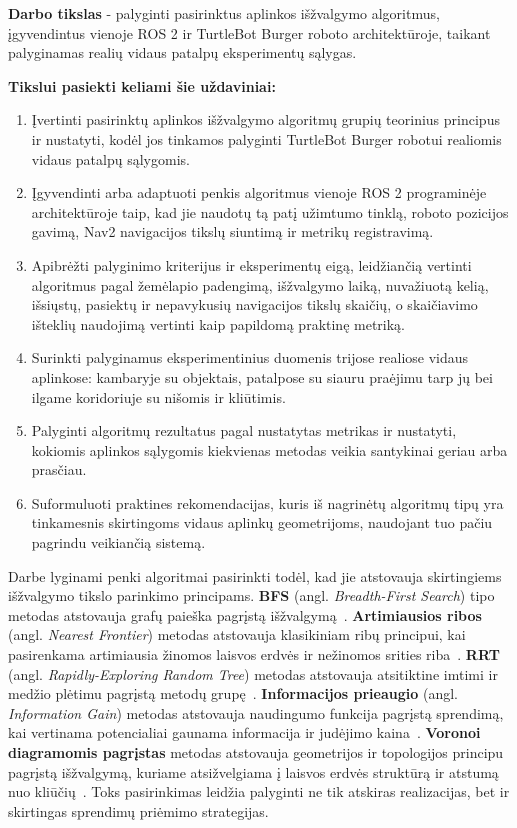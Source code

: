 \documentclass[]{VUMIFTemplateClass}
\begin{document}
\textbf{Darbo tikslas} - palyginti pasirinktus aplinkos išžvalgymo algoritmus, įgyvendintus vienoje ROS 2 ir TurtleBot Burger roboto architektūroje, taikant
palyginamas realių vidaus patalpų eksperimentų sąlygas.


\textbf{Tikslui pasiekti keliami šie uždaviniai:}
\begin{enumerate}
  \item Įvertinti pasirinktų aplinkos išžvalgymo algoritmų grupių teorinius principus ir nustatyti, kodėl jos tinkamos palyginti TurtleBot Burger robotui realiomis
 vidaus patalpų sąlygomis.
 \item Įgyvendinti arba adaptuoti penkis algoritmus vienoje ROS 2 programinėje architektūroje taip, kad jie naudotų tą patį užimtumo tinklą, roboto pozicijos
 gavimą, Nav2 navigacijos tikslų siuntimą ir metrikų registravimą.
 \item Apibrėžti palyginimo kriterijus ir eksperimentų eigą, leidžiančią vertinti algoritmus pagal žemėlapio padengimą, išžvalgymo laiką, nuvažiuotą kelią,
 išsiųstų, pasiektų ir nepavykusių navigacijos tikslų skaičių, o skaičiavimo išteklių naudojimą vertinti kaip papildomą praktinę metriką.
 \item Surinkti palyginamus eksperimentinius duomenis trijose realiose vidaus aplinkose: kambaryje su objektais, patalpose su siauru praėjimu tarp jų
 bei ilgame koridoriuje su nišomis ir kliūtimis.
 \item Palyginti algoritmų rezultatus pagal nustatytas metrikas ir nustatyti, kokiomis aplinkos sąlygomis kiekvienas metodas veikia santykinai geriau arba
 prasčiau.
 \item Suformuluoti praktines rekomendacijas, kuris iš nagrinėtų algoritmų tipų yra tinkamesnis skirtingoms vidaus aplinkų geometrijoms, naudojant tuo pačiu pagrindu veikiančią sistemą.
\end{enumerate}

Darbe lyginami penki algoritmai pasirinkti todėl, kad jie atstovauja skirtingiems išžvalgymo tikslo parinkimo principams. \textbf{BFS} (angl. \textit{Breadth-First Search}) tipo metodas
  atstovauja grafų paieška pagrįstą išžvalgymą~\cite{Introduction-to-Algorithms-book}. \textbf{Artimiausios ribos} (angl. \textit{Nearest Frontier}) metodas atstovauja klasikiniam ribų principui, kai pasirenkama artimiausia
žinomos laisvos erdvės ir nežinomos srities riba~\cite{yamauchi1997frontier}. \textbf{RRT} (angl. \textit{Rapidly-Exploring Random Tree}) metodas atstovauja atsitiktine imtimi ir medžio plėtimu pagrįstą metodų grupę~\cite{umari2017rrt}. \textbf{Informacijos prieaugio} (angl. \textit{Information Gain}) metodas atstovauja
naudingumo funkcija pagrįstą sprendimą, kai vertinama potencialiai gaunama informacija ir judėjimo kaina~\cite{pimentel2016infogain}. \textbf{Voronoi diagramomis pagrįstas} metodas atstovauja geometrijos ir
topologijos principu pagrįstą išžvalgymą, kuriame atsižvelgiama į laisvos erdvės struktūrą ir atstumą nuo kliūčių~\cite{chen2022gvd}. Toks pasirinkimas leidžia palyginti ne tik
atskiras realizacijas, bet ir skirtingas sprendimų priėmimo strategijas.
\end{document}
